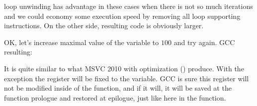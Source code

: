 {\Gls{loop unwinding} has advantage in these cases when there is not so much iterations and 
we could economy some execution speed by removing all loop supporting instructions. 
On the other side, resulting code is obviously larger.}

{OK, let's increase maximal value of the  variable to $100$ and try again. GCC resulting:}



{It is quite similar to what MSVC 2010 with optimization (\Ox) produce. 
With the exception the \EBX register will be fixed to the  variable.}
{GCC is sure this register will not be modified inside of the  function, 
and if it will, it will be saved at the function prologue and restored at epilogue, 
just like here in the \main function.}

